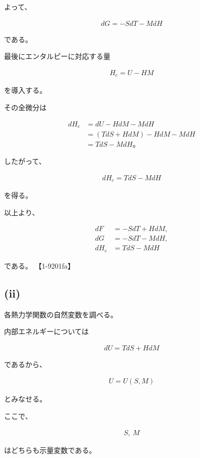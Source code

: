 \documentclass[platex,dvipdfmx,a4paper]{jsarticle}
\begin{document}
よって、

\begin{align*}
dG
=
-SdT-MdH
\end{align*}

である。

最後にエンタルピーに対応する量

\begin{align*}
H_c
=
U-HM
\end{align*}

を導入する。

その全微分は

\begin{align*}
dH_c
&=
dU-HdM-MdH \\
&=
(TdS+HdM)-HdM-MdH \\
&=
TdS-MdH。
\end{align*}

したがって、

\begin{align*}
dH_c
=
TdS-MdH
\end{align*}

を得る。

以上より、

\begin{align*}
dF&=-SdT+HdM, \\
dG&=-SdT-MdH, \\
dH_c&=TdS-MdH
\end{align*}

である。 【1-9201fa】

\subsection{(ii)}

各熱力学関数の自然変数を調べる。

内部エネルギーについては

\begin{align*}
dU
=
TdS+HdM
\end{align*}

であるから、

\begin{align*}
U=U(S,M)
\end{align*}

とみなせる。

ここで、

\begin{align*}
S,\ M
\end{align*}

はどちらも示量変数である。
\end{document}
